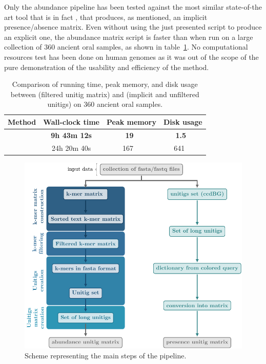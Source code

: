 Only the abundance pipeline has been tested against the most similar state-of-the art tool that is in fact \ggcat, that produces, as mentioned, an implicit presence/absence matrix. Even without using the just presented script to produce an explicit one, the abundance matrix script is faster than \ggcat when run on a large collection of 360 ancient oral samples, as shown in table~\ref{tab:muset_comparison}. No computational resources test has been done on human genomes as it was out of the scope of the pure demonstration of the usability and efficiency of the method. 

\begin{table}[!t]
	\centering
	\begin{tabular}{lccc}
		\toprule
		Method & Wall-clock time & Peak memory & Disk usage \\
		\midrule
		\muset & \textbf{9h 43m 12s} & \textbf{\SI[detect-weight=true]{19}{\textbf{\giga\byte}}} & \textbf{\SI[detect-weight=true]{1.5}{\textbf{\tera\byte}}}\\
		\ggcat & 24h 20m 40s & \SI{167}{\giga\byte} & \SI{641}{\giga\byte} \\
		\bottomrule
	\end{tabular}
	\caption{Comparison of running time, peak memory, and disk usage between \muset (filtered unitig matrix) and \ggcat (implicit and unfiltered unitigs) on 360 ancient oral samples.}\label{tab:muset_comparison}
\end{table}

\begin{figure}[h!]
	\centering
	\includegraphics[width=\linewidth]{figures/kmer_methods/muset_full.pdf}
	\caption[The \muset pipeline]{Scheme representing the main steps of the \muset pipeline.}
	\label{fig:muset}
\end{figure}

